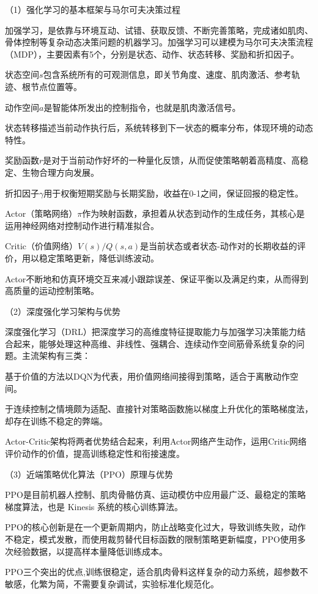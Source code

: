 （1）强化学习的基本框架与马尔可夫决策过程

加强学习，是依靠与环境互动、试错、获取反馈、不断完善策略，完成诸如肌肉、骨体控制等复杂动态决策问题的机器学习。加强学习可以建模为马尔可夫决策流程（MDP），主要因素有5个，分别是状态、动作、状态转移、奖励和折扣因子。

状态空间$s$包含系统所有的可观测信息，即关节角度、速度、肌肉激活、参考轨迹、根节点位置等。

动作空间$a$是智能体所发出的控制指令，也就是肌肉激活信号。

状态转移描述当前动作执行后，系统转移到下一状态的概率分布，体现环境的动态特性。

奖励函数$r$是对于当前动作好坏的一种量化反馈，从而促使策略朝着高精度、高稳定、生物合理方向发展。

折扣因子$\gamma$用于权衡短期奖励与长期奖励，收益在0-1之间，保证回报的稳定性。

Actor（策略网络）$\pi$作为映射函数，承担着从状态到动作的生成任务，其核心是运用神经网络对控制动作进行精准拟合。

Critic（价值网络）$V(s)/Q(s,a)$是当前状态或者状态-动作对的长期收益的评价，用以稳定策略更新，降低训练波动。

Actor不断地和仿真环境交互来减小跟踪误差、保证平衡以及满足约束，从而得到高质量的运动控制策略。

（2）深度强化学习架构与优势

深度强化学习（DRL）把深度学习的高维度特征提取能力与加强学习决策能力结合起来，能够处理这种高维、非线性、强耦合、连续动作空间筋骨系统复杂的问题。主流架构有三类：

基于价值的方法以DQN为代表，用价值网络间接得到策略，适合于离散动作空间。

于连续控制之情境颇为适配、直接针对策略函数施以梯度上升优化的策略梯度法，却存在训练不稳定的弊端。

Actor-Critic架构将两者优势结合起来，利用Actor网络产生动作，运用Critic网络评价动作的价值，提高训练稳定性和衔接速度。

（3）近端策略优化算法（PPO）原理与优势

PPO是目前机器人控制、肌肉骨骼仿真、运动模仿中应用最广泛、最稳定的策略梯度算法，也是
Kinesis 系统的核心训练算法。

PPO的核心创新是在一个更新周期内，防止战略变化过大，导致训练失败，动作不稳定，模式发散，而使用裁剪替代目标函数的限制策略更新幅度，PPO使用多次经验数据，以提高样本量降低训练成本。

PPO三个突出的优点,训练很稳定，适合肌肉骨料这样复杂的动力系统，超参数不敏感，化繁为简，不需要复杂调试，实验标准化规范化。

